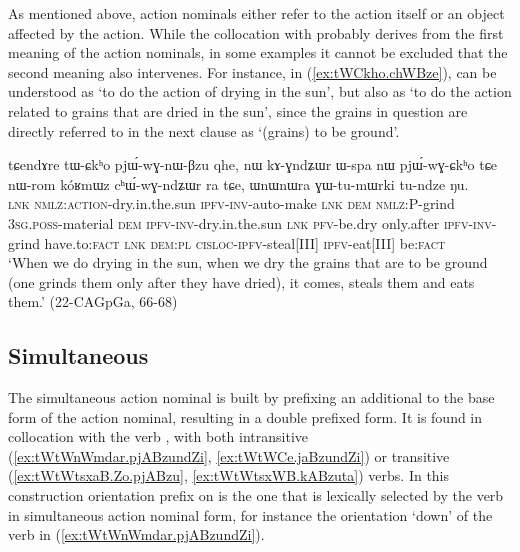 As mentioned above, action nominals either refer to the action itself or an object affected by the action. While the collocation with  probably derives from the first meaning of the action nominals, in some examples it cannot be excluded that the second meaning also intervenes. For instance, in (\ref{ex:tWCkho.chWBze}),  can be understood as `to do the action of drying in the sun', but also as `to do the action related to grains that are dried in the sun', since the grains in question are directly referred to in the next clause as  `(grains) to be ground'.

\begin{exe}
\ex \label{ex:tWCkho.chWBze}
\gll tɕendɤre tɯ-ɕkʰo pjɯ́-wɣ-nɯ-βzu qhe, nɯ kɤ-ɣndʑɯr ɯ-spa nɯ pjɯ́-wɣ-ɕkʰo tɕe nɯ-rom kóʁmɯz cʰɯ́-wɣ-ndʑɯr ra tɕe, ɯnɯnɯra ɣɯ-tu-mɯrki tu-ndze ŋu. \\
\textsc{lnk} \textsc{nmlz}:\textsc{action}-dry.in.the.sun \textsc{ipfv}-\textsc{inv}-auto-make \textsc{lnk} \textsc{dem} \textsc{nmlz}:P-grind \textsc{3sg}.\textsc{poss}-material \textsc{dem} \textsc{ipfv}-\textsc{inv}-dry.in.the.sun \textsc{lnk} \textsc{pfv}-be.dry only.after \textsc{ipfv}-\textsc{inv}-grind have.to:\textsc{fact} \textsc{lnk} \textsc{dem}:\textsc{pl} \textsc{cisloc}-\textsc{ipfv}-steal[III] \textsc{ipfv}-eat[III] be:\textsc{fact} \\
\glt `When we do drying in the sun, when we dry the grains that are to be ground (one grinds them only after they have dried), it comes, steals them and eats them.' (22-CAGpGa, 66-68)
\end{exe}

\subsection{Simultaneous} 
The simultaneous action nominal is built by prefixing an additional  to the base form of the action nominal, resulting in a double  prefixed form. It is found in collocation with the verb , with both intransitive (\ref{ex:tWtWnWmdar.pjABzundZi}, \ref{ex:tWtWCe.jaBzundZi}) or transitive (\ref{ex:tWtWtsxaB.Zo.pjABzu}, \ref{ex:tWtWtsxWB.kABzuta}) verbs. In this construction orientation prefix on  is the one that is lexically selected by the verb in simultaneous action nominal form, for instance the orientation `down'  of the verb  in (\ref{ex:tWtWnWmdar.pjABzundZi}).


